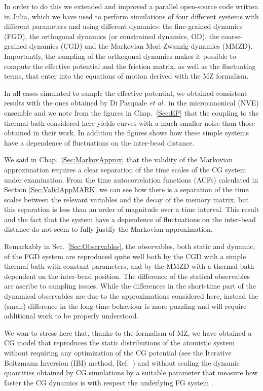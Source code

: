 \documentclass[10pt,a4paper]{book}
\theoremstyle{definition}
\begin{document}
\noindent
In order to do this we extended and improved a parallel open-source code written in Julia, which we have used to perform simulations of four different systems with different parameters and using different dynamics: the fine-grained dynamics (FGD), the orthogonal dynamics (or constrained dynamics, OD), the  coarse-grained dynamics (CGD) and the Markovian Mori-Zwanzig dynamics (MMZD). Importantly, the sampling of the orthogonal dynamics makes it possible to compute the effective potential and the friction matrix, as well as the fluctuating terms, that enter into the equations of motion derived with the MZ formalism.

In all cases simulated to sample the effective potential, we obtained consistent results with the ones obtained by Di Pasquale \textit{et al.}~in the microcanonical (NVE) ensemble and we note from the figures in Chap.~\ref{Sec:EP} that the coupling to the thermal bath considered here yields curves with a much smaller noise than those obtained in their work. In addition the figures shows how these simple systems have a dependence of fluctuations on the inter-bead distance.

We said in Chap.~\ref{Sec:MarkovApprox} that the validity of the Markovian approximation requires a clear separation of the time scales of the CG system under examination. From the time autocorrelation functions (ACFs) calculated in Section \ref{Sec:ValidAppMARK} we can see how there is a separation of the time scales between the relevant variables and the decay of the memory matrix, but this separation is less than an order of magnitude over a time interval. This result and the fact that the system have a dependence of fluctuations on the inter-bead distance do not seem to fully justify the Markovian approximation.

Remarkably in Sec.~\ref{Sec:Observables}, the observables, both static and dynamic, of the FGD system are reproduced quite well both by the CGD with a simple thermal bath with constant parameters, and by the MMZD with a thermal bath dependent on the inter-bead position. The difference of the statical observables are ascribe to sampling issues. While the differences in the short-time part of the dynamical observables are due to the approximations considered here, instead  the (small) difference in the long-time behaviour is more puzzling and will require additional work to be properly understood.

We wan to stress here that, thanks to the formalism of MZ, we have obtained a CG model that reproduces the static distributions of the atomistic system without requiring any optimization of the CG potential (see the Iterative Boltzmann Inversion (IBI) method, Ref.~\cite{Reith2003}) and without scaling the dynamic quantities obtained by CG simulations by a suitable parameter that measure how faster the CG dynamics is with respect the underlying FG system \cite{Fritz2009}.
\end{document}
